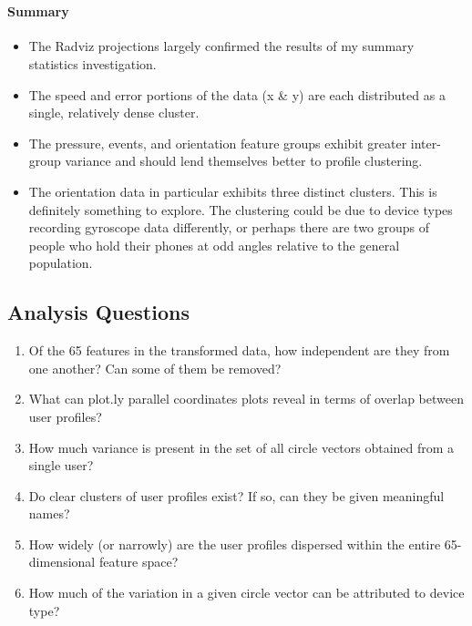 \documentclass[11pt]{article}
\providecommand{\tightlist}{%
      \setlength{\itemsep}{0pt}\setlength{\parskip}{0pt}}
\begin{document}
    \begin{center}
    \end{center}
    { \hspace*{\fill} \\}
    
    \hypertarget{summary}{%
\paragraph{Summary}\label{summary}}

\begin{itemize}
\tightlist
\item
  The Radviz projections largely confirmed the results of my summary
  statistics investigation.
\item
  The speed and error portions of the data (x \& y) are each distributed
  as a single, relatively dense cluster.
\item
  The pressure, events, and orientation feature groups exhibit greater
  inter-group variance and should lend themselves better to profile
  clustering.
\item
  The orientation data in particular exhibits three distinct clusters.
  This is definitely something to explore. The clustering could be due
  to device types recording gyroscope data differently, or perhaps there
  are two groups of people who hold their phones at odd angles relative
  to the general population.
\end{itemize}

    \hypertarget{analysis-questions}{%
\subsection{Analysis Questions}\label{analysis-questions}}

    \begin{enumerate}
\def\labelenumi{\arabic{enumi}.}
\tightlist
\item
  Of the 65 features in the transformed data, how independent are they
  from one another? Can some of them be removed?
\item
  What can plot.ly parallel coordinates plots reveal in terms of overlap
  between user profiles?
\item
  How much variance is present in the set of all circle vectors obtained
  from a single user?
\item
  Do clear clusters of user profiles exist? If so, can they be given
  meaningful names?
\item
  How widely (or narrowly) are the user profiles dispersed within the
  entire 65-dimensional feature space?
\item
  How much of the variation in a given circle vector can be attributed
  to device type?
\end{enumerate}


    
    
    
    
\end{document}
